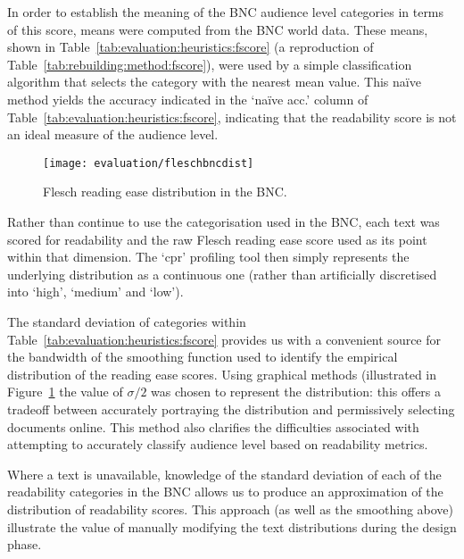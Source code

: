 
In order to establish the meaning of the BNC audience level categories in terms of this score, means were computed from the BNC world data.  These means, shown in Table~\ref{tab:evaluation:heuristics:fscore} (a reproduction of Table~\ref{tab:rebuilding:method:fscore}), were used by a simple classification algorithm that selects the category with the nearest mean value.  This na\"ive method yields the accuracy indicated in the `na\"ive acc.' column of Table~\ref{tab:evaluation:heuristics:fscore}, indicating that the readability score is not an ideal measure of the audience level.



\begin{figure}[h]
    \centering
    \texttt{[image: evaluation/fleschbncdist]}
    \caption{Flesch reading ease distribution in the BNC.}
    \label{fig:evaluation:heuristics:fleschbncdist}
\end{figure}


Rather than continue to use the categorisation used in the BNC, each text was scored for readability and the raw Flesch reading ease score used as its point within that dimension.  The `cpr' profiling tool then simply represents the underlying distribution as a continuous one (rather than artificially discretised into `high', `medium' and `low').

The standard deviation of categories within Table~\ref{tab:evaluation:heuristics:fscore} provides us with a convenient source for the bandwidth of the smoothing function used to identify the empirical distribution of the reading ease scores.  Using graphical methods (illustrated in Figure~\ref{fig:evaluation:heuristics:fleschbncdist} the value of $\sigma / 2$ was chosen to represent the distribution: this offers a tradeoff between accurately portraying the distribution and permissively selecting documents online.  This method also clarifies the difficulties associated with attempting to accurately classify audience level based on readability metrics.

Where a text is unavailable, knowledge of the standard deviation of each of the readability categories in the BNC allows us to produce an approximation of the distribution of readability scores.  This approach (as well as the smoothing above) illustrate the value of manually modifying the text distributions during the design phase.

